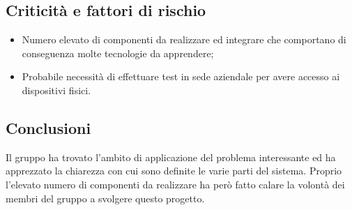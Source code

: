 \subsection{Criticità e fattori di rischio}
\begin{itemize}
	\item Numero elevato di componenti da realizzare ed integrare che comportano di conseguenza molte tecnologie da apprendere; 
	\item Probabile necessità di effettuare test in sede aziendale per avere accesso ai dispositivi fisici.
\end{itemize}
\subsection{Conclusioni}
Il gruppo ha trovato l'ambito di applicazione del problema interessante ed ha apprezzato la chiarezza con cui sono definite le varie parti del sistema. Proprio l'elevato numero di componenti da realizzare ha però fatto calare la volontà dei membri del gruppo a svolgere questo progetto.
